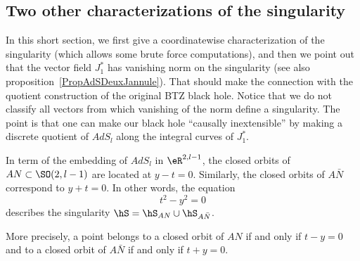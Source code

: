 \subsection{Two other characterizations of the singularity}		\label{SubSecTwoCharSing}

In this short section, we first give a coordinatewise characterization of the singularity (which allows some brute force computations), and then we point out that the vector field $J_1^*$ has vanishing norm on the singularity (see also proposition~\ref{PropAdSDeuxJannule}). That should make the connection with the quotient construction of the original BTZ black hole.  Notice that we do not classify all vectors from which vanishing of the norm define a singularity. The point is that one can make our black hole ``causally inextensible'' by making a discrete quotient of $AdS_l$ along the integral curves of $J^*_1$.

\begin{proposition}		\label{Proptcarrycarr}
In term of the embedding of $AdS_l$ in $\eR^{2,l-1}$, the closed orbits of $AN \subset \SO(2,l-1)$ are located at $y-t = 0$.  Similarly, the closed orbits of $A \bar{N}$ correspond to $y+t=0$. In other words, the equation
\begin{equation} \label{tcarrycarr}
t^2-y^2=0
 \end{equation}
describes the singularity $\hS=\hS_{AN}\cup\hS_{A\bar{N}}$.

More precisely, a point belongs to a closed orbit of $AN$ if and only if $t-y=0$ and to a closed orbit of $A\bar N$ if and only if $t+y=0$.
\end{proposition}

